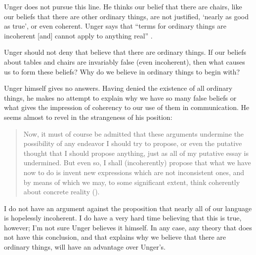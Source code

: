 \documentclass[11pt]{article}
\newenvironment{squote}{%
	\begin{quote}\begin{singlespace}%
	}{%
	\end{singlespace}\end{quote}}
\begin{document}
\begin{spacing}{1.5}
Unger does not pursue this line.  He thinks our belief that there are
chairs, like our beliefs that there are other ordinary things, are not
justified, `nearly as good as true', or even coherent.  Unger says
that ``terms for ordinary things are incoherent [and] cannot apply to
anything real'' \citep[147]{unger1979}.

Unger should not deny that believe that there are ordinary things.  If
our beliefs about tables and chairs are invariably false (even
incoherent), then what causes us to form these beliefs?  Why do we
believe in ordinary things to begin with?

Unger himself gives no answers.  Having denied the existence of all
ordinary things, he makes no attempt to explain why we have so many
false beliefs or what gives the impression of coherency to our use of
them in communication.  He seems almost to revel in the strangeness of
his position:

\begin{squote}
Now, it must of course be admitted that these arguments undermine the
possibility of any endeavor I should try to propose, or even the
putative thought that I should propose anything, just as all of my
putative essay is undermined.  But even so, I shall (incoherently)
propose that what we have now to do is invent new expressions which
are not inconsistent ones, and by means of which we may, to some
significant extent, think coherently about concrete reality
(\citeyear[544]{unger1980b}).
\end{squote}

I do not have an argument against the proposition that nearly all of
our language is hopelessly incoherent.  I do have a very hard time
believing that this is true, however; I'm not sure Unger believes it
himself.  In any case, any theory that does not have this conclusion,
and that explains why we believe that there are ordinary things, will
have an advantage over Unger's.

\ifstandalone


\end{spacing}
\fi
\end{document}
